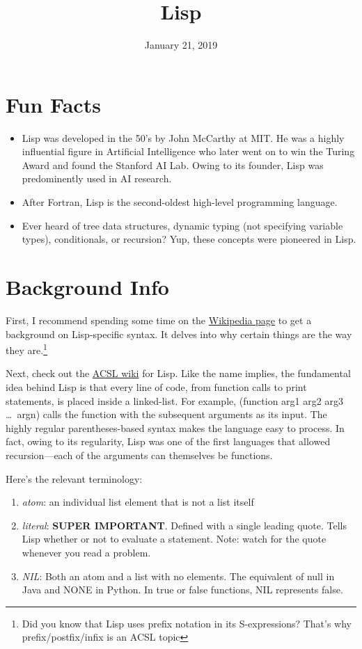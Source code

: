 \documentclass{pset_template}
\title{Lisp}
\date{January 21, 2019}
\begin{document}
\maketitle

\section{Fun Facts}
\begin{itemize}
    \item Lisp was developed in the 50's by John McCarthy at MIT.
    He was a highly influential figure in Artificial Intelligence who later
    went on to win the Turing Award and found the Stanford AI Lab.
    Owing to its founder, Lisp was predominently used in AI research.
    \item After Fortran, Lisp is the second-oldest high-level programming language.
    \item Ever heard of tree data structures, dynamic typing (not specifying variable types), conditionals, or recursion?
    Yup, these concepts were pioneered in Lisp.
\end{itemize}

\section{Background Info}
First, I recommend spending some time on the
\href{https://en.wikipedia.org/wiki/Lisp_(programming_language)#Syntax_and_semantics}{Wikipedia page} to get a background on Lisp-specific syntax.
It delves into why certain things are the way they are.\footnote{Did
you know that Lisp uses prefix notation in its S-expressions?
That's why prefix/postfix/infix is an ACSL topic}

Next, check out the \href{http://www.categories.acsl.org/wiki/index.php?title=LISP}{ACSL wiki} for Lisp.
Like the name implies, the fundamental idea behind Lisp is that every
line of code, from function calls to print statements,
is placed inside a linked-list.
For example, (function arg1 arg2 arg3 \ldots~argn)
calls the function with the subsequent arguments as its input.
The highly regular parentheses-based syntax makes the language
easy to process.
In fact, owing to its regularity, Lisp was one of the first languages
that allowed recursion---each of the arguments can themselves
be functions.

Here's the relevant terminology:
\begin{enumerate}
    \item \textit{atom}: an individual list element that is not a list itself
    \item \textit{literal}: \textbf{SUPER IMPORTANT}.
    Defined with a single leading quote.
    Tells Lisp whether or not to evaluate a statement.
    Note: watch for the quote whenever you read a problem.
    \item \textit{NIL}: Both an atom and a list with no elements.
    The equivalent of null in Java and NONE in Python.
    In true or false functions, NIL represents false.
\end{enumerate}
\end{document}
